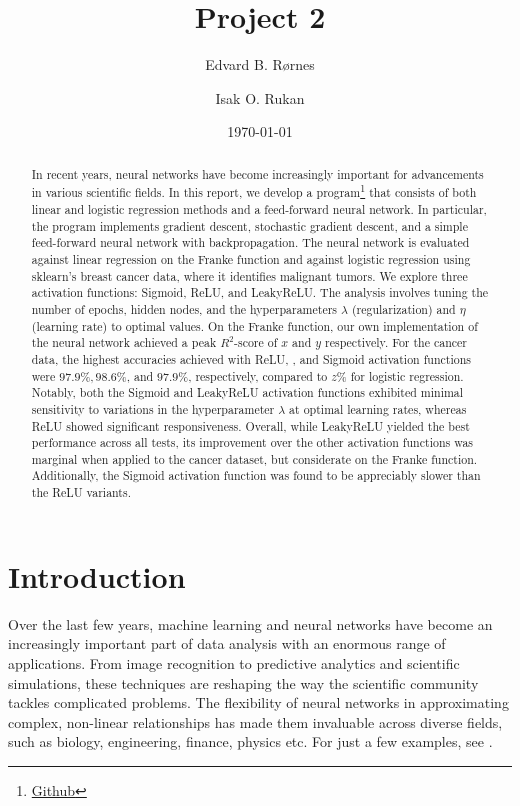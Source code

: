 \documentclass[%
reprint,s
amsmath,amssymb,
aps,
]{revtex4-2}
\begin{document}
	
\title{Project 2}
\author{Edvard B. Rørnes}
\author{Isak O. Rukan}
\date{\today}

\begin{abstract}
	In recent years, neural networks have become increasingly important for advancements in various scientific fields. In this report, we develop a program\footnote{\href{https://github.com/EdvardRornes/FYS-STK4155/tree/main/Project1}{Github}} that consists of both linear and logistic regression methods and a feed-forward neural network. In particular, the program implements gradient descent, stochastic gradient descent, and a simple feed-forward neural network with backpropagation. The neural network is evaluated against linear regression on the Franke function and against logistic regression using sklearn's breast cancer data, where it identifies malignant tumors. We explore three activation functions: Sigmoid, ReLU, and LeakyReLU. The analysis involves tuning the number of epochs, hidden nodes, and the hyperparameters $\lambda$ (regularization) and $\eta$ (learning rate) to optimal values. On the Franke function, our own implementation of the neural network achieved a peak $R^2$-score of $x$ and $y$ respectively. For the cancer data, the highest accuracies achieved with ReLU, , and Sigmoid activation functions were $97.9\%, 98.6\%$, and $97.9\%$, respectively, compared to $z\%$ for logistic regression. Notably, both the Sigmoid and LeakyReLU activation functions exhibited minimal sensitivity to variations in the hyperparameter $\lambda$ at optimal learning rates, whereas ReLU showed significant responsiveness. Overall, while LeakyReLU yielded the best performance across all tests, its improvement over the other activation functions was marginal when applied to the cancer dataset, but considerate on the Franke function. Additionally, the Sigmoid activation function was found to be appreciably slower than the ReLU variants.
\end{abstract}

\maketitle

\section{Introduction}
Over the last few years, machine learning and neural networks have become an increasingly important part of data analysis with an enormous range of applications. From image recognition to predictive analytics and scientific simulations, these techniques are reshaping the way the scientific community tackles complicated problems. The flexibility of neural networks in approximating complex, non-linear relationships has made them invaluable across diverse fields, such as biology, engineering, finance, physics etc. For just a few examples, see \cite{dawid2023modernapplicationsmachinelearning,thapar2023applicationsmachinelearningmodelling,mohammadi2022applicationsmachinelearninghealthcare}.
\end{document}
